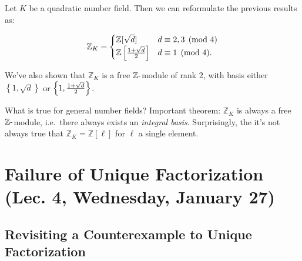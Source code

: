 \begin{remark}

Let \(K\) be a quadratic number field. Then we can reformulate the
previous results as:

\begin{align*}
{\mathbb{Z}}_K = 
\begin{cases}
{\mathbb{Z}}[ \sqrt{d} ] &  d \equiv 2,3 \pmod 4
\\
{\mathbb{Z}}\left[{1 + \sqrt{d} \over 2}\right] & d \equiv 1 \pmod 4.
\end{cases}
\end{align*}

We've also shown that \({\mathbb{Z}}_K\) is a free
\({\mathbb{Z}}{\hbox{-}}\)module of rank 2, with basis either
\(\left\{{ 1, \sqrt{d} }\right\}\) or
\(\left\{{ 1, {1 + \sqrt{d} \over 2 } }\right\}\).

\end{remark}

\begin{remark}

What is true for general number fields? Important theorem:
\({\mathbb{Z}}_K\) is always a free \({\mathbb{Z}}{\hbox{-}}\)module,
i.e.~there always exists an \emph{integral basis}. Surprisingly, the
it's not always true that \({\mathbb{Z}}_K = {\mathbb{Z}}[\ell]\) for
\(\ell\) a single element.

\end{remark}

\hypertarget{failure-of-unique-factorization-lec.-4-wednesday-january-27}{%
\section{Failure of Unique Factorization (Lec. 4, Wednesday, January
27)}\label{failure-of-unique-factorization-lec.-4-wednesday-january-27}}

\hypertarget{revisiting-a-counterexample-to-unique-factorization}{%
\subsection{Revisiting a Counterexample to Unique
Factorization}\label{revisiting-a-counterexample-to-unique-factorization}}

